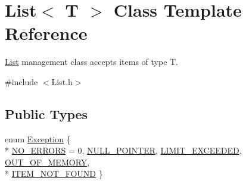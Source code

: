 \hypertarget{class_list}{\section{List$<$ T $>$ Class Template Reference}
\label{class_list}
}


\hyperlink{class_list}{List} management class accepts items of type T.  




{\ttfamily \#include $<$List.\-h$>$}

\subsection*{Public Types}
\begin{DoxyCompactItemize}
\item 
enum \hyperlink{class_list_af1ab8d5d6d02ed4b4034247619c7119e}{Exception} \{ \\*
\hyperlink{class_list_af1ab8d5d6d02ed4b4034247619c7119eaaeccdc6fa5e81404feb625ede5e5519c}{N\-O\-\_\-\-E\-R\-R\-O\-R\-S} = 0, 
\hyperlink{class_list_af1ab8d5d6d02ed4b4034247619c7119eaff24fe8e450a0c0fecb93e1401f74ded}{N\-U\-L\-L\-\_\-\-P\-O\-I\-N\-T\-E\-R}, 
\hyperlink{class_list_af1ab8d5d6d02ed4b4034247619c7119ea975fb67a45b4f681e23ff7c530100e12}{L\-I\-M\-I\-T\-\_\-\-E\-X\-C\-E\-E\-D\-E\-D}, 
\hyperlink{class_list_af1ab8d5d6d02ed4b4034247619c7119eab6e7b44ff385f7c19a7ac6e8eb25f8f2}{O\-U\-T\-\_\-\-O\-F\-\_\-\-M\-E\-M\-O\-R\-Y}, 
\\*
\hyperlink{class_list_af1ab8d5d6d02ed4b4034247619c7119eaeb837798b3959e8aec6a76082af31b66}{I\-T\-E\-M\-\_\-\-N\-O\-T\-\_\-\-F\-O\-U\-N\-D}
 \}
\end{DoxyCompactItemize}
